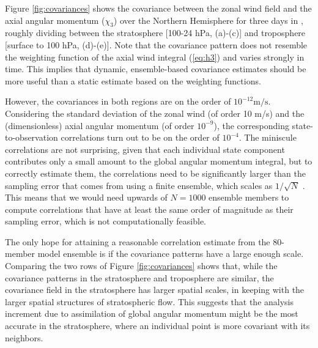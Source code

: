 Figure \ref{fig:covariances} shows the covariance between the zonal wind field and the axial angular momentum ($\chi_3$) over the Northern Hemisphere for three days in \ERPALL, roughly dividing between the 
stratosphere [100-24 hPa, (a)-(c)] 
and
troposphere [surface to 100 hPa, (d)-(e)].
Note that the covariance pattern does not resemble the weighting function of the axial wind integral (\ref{eq:h3}) 
and varies strongly in time. 
This implies that dynamic, ensemble-based covariance estimates should be more useful than a static estimate based on the weighting functions.

However, the covariances in both regions are on the order of $10^{-12}\text{m/s}$.  
Considering the standard deviation of the zonal wind (of order 10 m/s) and the (dimensionless) axial angular momentum (of order $10^{-9}$), the corresponding state-to-observation correlations turn out to be on the order of $10^{-4}$. 
The miniscule correlations are not surprising, given that each individual state component contributes only a small amount to the global angular momentum integral, but to 
correctly estimate them, the correlations need to be significantly larger than the sampling error that comes from using a finite ensemble, which 
scales as $1/\sqrt{N}$ \citep{Houtekamer1998}. 
This means that we would need upwards of $N=1000$ ensemble members to compute correlations that have at least the same order of magnitude as their sampling error, which is not computationally feasible. 

The only hope for attaining a reasonable correlation estimate from the 80-member model ensemble is if the covariance patterns have a large enough scale.  
Comparing the two rows of Figure \ref{fig:covariances} shows that, while
the covariance patterns in the stratosphere and troposphere are similar, the covariance field in the stratosphere has larger spatial scales, in keeping with the larger spatial structures of stratospheric flow.
This suggests that the analysis increment due to assimilation of global angular momentum might be the most accurate in the stratosphere, where an individual point is more covariant with its neighbors.  

